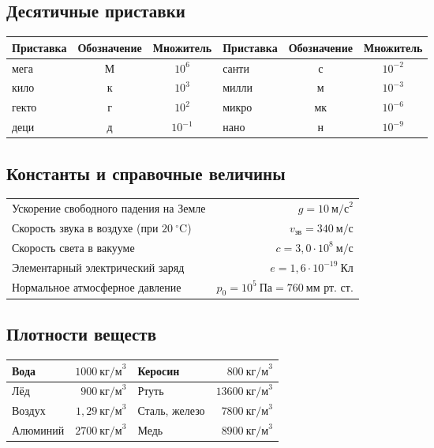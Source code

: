 \begingroup
\footnotesize
\setlength{\parskip}{2pt}
\setlength{\tabcolsep}{3.5pt}
\renewcommand{\arraystretch}{0.92}

\subsection*{Десятичные приставки}
\noindent\begin{tabularx}{\textwidth}{|>{\raggedright\arraybackslash}X|c|c||>{\raggedright\arraybackslash}X|c|c|}
\hline
\textbf{Приставка} & \textbf{Обозначение} & \textbf{Множитель} & \textbf{Приставка} & \textbf{Обозначение} & \textbf{Множитель} \\ \hline
мега  & М & $10^6$  & санти & с & $10^{-2}$ \\ \hline
кило  & к & $10^3$  & милли & м & $10^{-3}$ \\ \hline
гекто & г & $10^2$  & микро & мк & $10^{-6}$ \\ \hline
деци  & д & $10^{-1}$ & нано  & н & $10^{-9}$ \\ \hline
\end{tabularx}

\subsection*{Константы и справочные величины}
\noindent\begin{tabularx}{\linewidth}{>{\raggedright\arraybackslash}X r}
Ускорение свободного падения на Земле & $g = 10~\text{м/с}^2$ \\
Скорость звука в воздухе (при $20~^\circ\text{C}$) & $v_{\text{зв}} = 340~\text{м/с}$ \\
Скорость света в вакууме & $c = 3{,}0 \cdot 10^8~\text{м/с}$ \\
Элементарный электрический заряд & $e = 1{,}6 \cdot 10^{-19}~\text{Кл}$ \\
Нормальное атмосферное давление & $p_0 = 10^5~\text{Па} = 760~\text{мм рт. ст.}$ \\
\end{tabularx}

\subsection*{Плотности веществ}
\noindent\begin{tabularx}{\linewidth}{X r || X r}
\hline
Вода & $1000~\text{кг/м}^3$ & Керосин & $800~\text{кг/м}^3$ \\ \hline
Лёд & $900~\text{кг/м}^3$   & Ртуть & $13600~\text{кг/м}^3$ \\ \hline
Воздух & $1{,}29~\text{кг/м}^3$ & Сталь, железо & $7800~\text{кг/м}^3$ \\ \hline
Алюминий & $2700~\text{кг/м}^3$ & Медь & $8900~\text{кг/м}^3$ \\ \hline
\end{tabularx}

